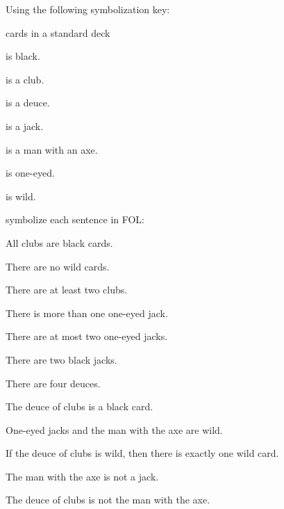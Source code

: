 \begin{practiceproblems}
\solutions
\problempart
\label{pr:FOLcards-1}
Using the following symbolization key:
\begin{ekey}
\item[\text{domain}] cards in a standard deck
\item[Bx]  is black.
\item[Cx]  is a club.
\item[Dx]  is a deuce.
\item[Jx]  is a jack.
\item[Mx]  is a man with an axe.
\item[Ox]  is one-eyed.
\item[Wx]  is wild.
\end{ekey}
symbolize each sentence in FOL:
\begin{problemslist}
\item All clubs are black cards.
\item There are no wild cards.
\item There are at least two clubs.
\item There is more than one one-eyed jack.
\item There are at most two one-eyed jacks.
\item There are two black jacks.
\item There are four deuces.
\item The deuce of clubs is a black card.
\item One-eyed jacks and the man with the axe are wild.
\item If the deuce of clubs is wild, then there is exactly one wild card.
\item The man with the axe is not a jack.
\item The deuce of clubs is not the man with the axe.
\end{problemslist}

\


\end{practiceproblems}
